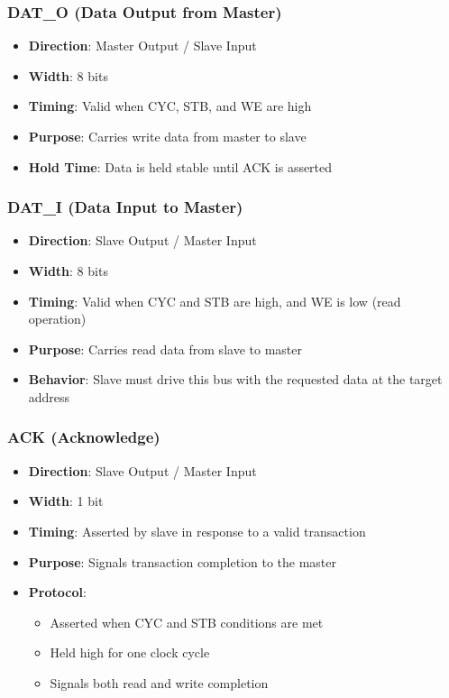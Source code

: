 \documentclass[12pt,a4paper]{article}
\begin{document}
\subsubsection{DAT\_O (Data Output from Master)}
\begin{itemize}
    \item \textbf{Direction}: Master Output / Slave Input
    \item \textbf{Width}: 8 bits
    \item \textbf{Timing}: Valid when CYC, STB, and WE are high
    \item \textbf{Purpose}: Carries write data from master to slave
    \item \textbf{Hold Time}: Data is held stable until ACK is asserted
\end{itemize}

\subsubsection{DAT\_I (Data Input to Master)}
\begin{itemize}
    \item \textbf{Direction}: Slave Output / Master Input
    \item \textbf{Width}: 8 bits
    \item \textbf{Timing}: Valid when CYC and STB are high, and WE is low (read operation)
    \item \textbf{Purpose}: Carries read data from slave to master
    \item \textbf{Behavior}: Slave must drive this bus with the requested data at the target address
\end{itemize}

\subsubsection{ACK (Acknowledge)}
\begin{itemize}
    \item \textbf{Direction}: Slave Output / Master Input
    \item \textbf{Width}: 1 bit
    \item \textbf{Timing}: Asserted by slave in response to a valid transaction
    \item \textbf{Purpose}: Signals transaction completion to the master
    \item \textbf{Protocol}: 
    \begin{itemize}
        \item Asserted when CYC and STB conditions are met
        \item Held high for one clock cycle
        \item Signals both read and write completion
    \end{itemize}
\end{itemize}
\end{document}
